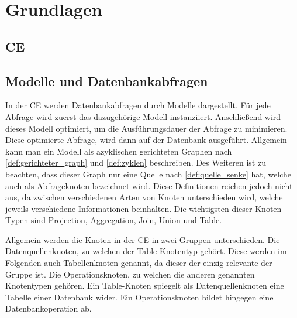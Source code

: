 \chapter{Grundlagen}

\section{\acl{CE}}

\section{Modelle und Datenbankabfragen}
\label{sec:modells_db_queries}
In der \ac{CE} werden Datenbankabfragen durch Modelle dargestellt.
Für jede Abfrage wird zuerst das dazugehörige Modell instanziiert.
Anschließend wird dieses Modell optimiert, um die Ausführungsdauer der Abfrage zu minimieren. 
Diese optimierte Abfrage, wird dann auf der Datenbank ausgeführt.
Allgemein kann man ein Modell als azyklischen gerichteten Graphen nach
\autoref{def:gerichteter_graph} und \autoref{def:zyklen} beschreiben.
Des Weiteren ist zu beachten, dass dieser Graph nur eine Quelle nach
\autoref{def:quelle_senke} hat, welche auch als Abfrageknoten bezeichnet wird.
Diese Definitionen reichen jedoch nicht aus, da zwischen verschiedenen
Arten von Knoten unterschieden wird, welche jeweils verschiedene Informationen
beinhalten. Die wichtigsten dieser Knoten Typen sind
\foreignlanguage{english}{Projection}, \foreignlanguage{english}{Aggregation},
\foreignlanguage{english}{Join}, \foreignlanguage{english}{Union} und
\foreignlanguage{english}{Table}.

Allgemein werden die Knoten in der \ac{CE} in zwei Gruppen unterschieden.
Die Datenquellenknoten, zu welchen \zB der
\foreignlanguage{english}{Table} Knotentyp gehört. Diese werden im Folgenden
auch Tabellenknoten genannt, da dieser der einzig relevante der Gruppe ist.
Die Operationsknoten, zu welchen die anderen genannten Knotentypen gehören.
Ein \foreignlanguage{english}{Table}-Knoten spiegelt als Datenquellenknoten
eine Tabelle einer Datenbank wider. Ein Operationsknoten bildet hingegen eine
Datenbankoperation ab.

